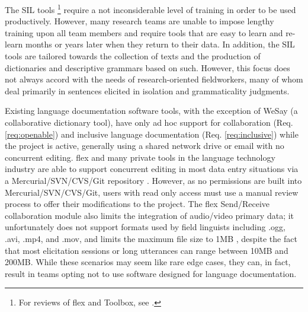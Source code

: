 \documentclass[11pt]{article}
\begin{document}
The SIL tools%
\footnote{For reviews of \gls{flex} and Toolbox, see
\cite{Butler:2007,rogers10,robinson07}.} %
require a not inconsiderable level of training in order to be used productively.
However, many research teams are unable to impose lengthy training upon all
team members and require tools that are easy to learn and re-learn months or
years later when they return to their data. In addition, the SIL tools are
tailored towards the collection of texts and the production of dictionaries and
descriptive grammars based on such. However, this focus does not always accord
with the needs of research-oriented fieldworkers, many of whom deal primarily
in sentences elicited in isolation and grammaticality judgments.


Existing language documentation software tools, with the exception of WeSay (a
collaborative dictionary tool), have only ad hoc support for collaboration
(Req. \autoref{req:openable}) and inclusive language documentation (Req.
\autoref{req:inclusive}) while the project is active, generally using a shared
network drive or email with no concurrent editing. \gls{flex} and many private
tools in the language technology industry are able to support concurrent
editing in most data entry situations via a Mercurial/SVN/CVS/Git repository
\cite{FLExSendReceive:2013:Online}. 
However, as no permissions are built into Mercurial/SVN/CVS/Git, users with
read only access  must use a manual review process to offer their modifications
to the project. 
The \gls{flex} Send/Receive  collaboration module also limits the integration of
audio/video primary data; it unfortunately does not support formats used by
field linguists including .ogg, .avi, .mp4, and .mov, and limits the maximum
file size to 1MB  \cite{FLExSendReceive:2013:Online}, despite the fact that
most elicitation sessions or long utterances can range between 10MB and 200MB. 
While these scenarios may seem like rare edge cases, they can, in fact, result
in teams opting not to use software designed for language documentation.
\end{document}
